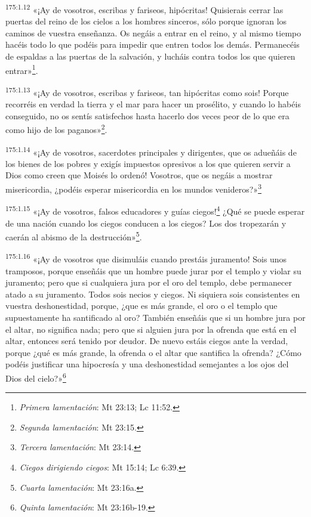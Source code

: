 \par
\textsuperscript{175:1.12} «¡Ay de vosotros, escribas y fariseos, hipócritas! Quisierais cerrar las puertas del reino de los cielos a los hombres sinceros, sólo porque ignoran los caminos de vuestra enseñanza. Os negáis a entrar en el reino, y al mismo tiempo hacéis todo lo que podéis para impedir que entren todos los demás. Permanecéis de espaldas a las puertas de la salvación, y lucháis contra todos los que quieren entrar»\footnote{\textit{Primera lamentación}: Mt 23:13; Lc 11:52.}.

\par
\textsuperscript{175:1.13} «¡Ay de vosotros, escribas y fariseos, tan hipócritas como sois! Porque recorréis en verdad la tierra y el mar para hacer un prosélito, y cuando lo habéis conseguido, no os sentís satisfechos hasta hacerlo dos veces peor de lo que era como hijo de los paganos»\footnote{\textit{Segunda lamentación}: Mt 23:15.}.

\par
\textsuperscript{175:1.14} «¡Ay de vosotros, sacerdotes principales y dirigentes, que os adueñáis de los bienes de los pobres y exigís impuestos opresivos a los que quieren servir a Dios como creen que Moisés lo ordenó! Vosotros, que os negáis a mostrar misericordia, ¿podéis esperar misericordia en los mundos venideros?»\footnote{\textit{Tercera lamentación}: Mt 23:14.}

\par
\textsuperscript{175:1.15} «¡Ay de vosotros, falsos educadores y guías ciegos!\footnote{\textit{Ciegos dirigiendo ciegos}: Mt 15:14; Lc 6:39.} ¿Qué se puede esperar de una nación cuando los ciegos conducen a los ciegos? Los dos tropezarán y caerán al abismo de la destrucción»\footnote{\textit{Cuarta lamentación}: Mt 23:16a.}.

\par
\textsuperscript{175:1.16} «¡Ay de vosotros que disimuláis cuando prestáis juramento! Sois unos tramposos, porque enseñáis que un hombre puede jurar por el templo y violar su juramento; pero que si cualquiera jura por el oro del templo, debe permanecer atado a su juramento. Todos sois necios y ciegos. Ni siquiera sois consistentes en vuestra deshonestidad, porque, ¿que es más grande, el oro o el templo que supuestamente ha santificado al oro? También enseñáis que si un hombre jura por el altar, no significa nada; pero que si alguien jura por la ofrenda que está en el altar, entonces será tenido por deudor. De nuevo estáis ciegos ante la verdad, porque ¿qué es más grande, la ofrenda o el altar que santifica la ofrenda? ¿Cómo podéis justificar una hipocresía y una deshonestidad semejantes a los ojos del Dios del cielo?»\footnote{\textit{Quinta lamentación}: Mt 23:16b-19.}

